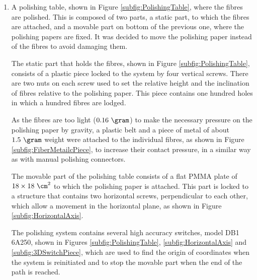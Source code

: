 \begin{enumerate}
\item{} A polishing table, shown in Figure \ref{subfig:PolishingTable}, where the fibres are polished. This is composed of two parts, a static part, to which the fibres are attached, and a movable part on bottom of the previous one, where the polishing papers are fixed. It was decided to move the polishing paper instead of the fibres to avoid damaging them.

The static part that holds the fibres, shown in Figure \ref{subfig:PolishingTable}, consists of a plastic piece locked to the system by four vertical screws. There are two nuts on each screw used to set the relative height and the inclination of fibres relative to the polishing paper. This piece contains one hundred holes in which a hundred fibres are lodged. 

As the fibres are too light ($0.16~\gram$) to make the necessary pressure on the polishing paper by gravity, a plastic belt and a piece of metal of about $1.5~\gram$ weight were attached to the individual fibres, as shown in Figure \ref{subfig:FiberMetailcPiece}, to increase their contact pressure, in a similar way as with manual polishing connectors. 

The movable part of the polishing table consists of a flat PMMA plate of $18 \times 18~\cm^2$ to which the polishing paper is attached. This part is locked to a structure \cite{StructureAxis} that contains two horizontal screws, perpendicular to each other, which allow a movement in the horizontal plane, as shown in Figure \ref{subfig:HorizontalAxis}.

The polishing system contains several high accuracy switches, model DB1 6A250, shown in Figures \ref{subfig:PolishingTable}, \ref{subfig:HorizontalAxis} and \ref{subfig:3DSwitchPiece}, which are used to find the origin of coordinates when the system is reinitiated and to stop the movable part when the end of the path is reached. 


\end{enumerate}

